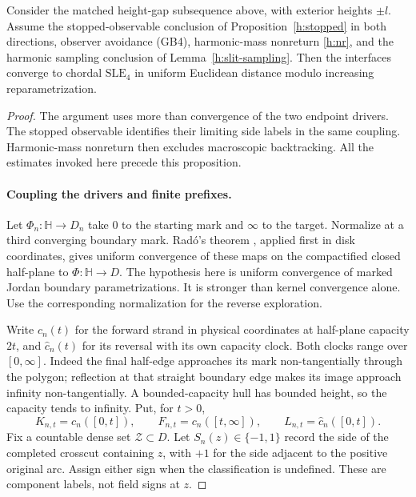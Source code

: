 \begin{proposition}
\label{h:uniform-path}
Consider the matched height-gap subsequence above, with exterior heights
$\pm l$. Assume the stopped-observable conclusion of
Proposition~\ref{h:stopped} in both directions, observer avoidance
\textup{(GB4)}, harmonic-mass nonreturn \eqref{h:nr}, and the harmonic
sampling conclusion of Lemma~\ref{h:slit-sampling}. Then the interfaces
converge to chordal $\mathrm{SLE}_4$ in uniform Euclidean distance modulo
increasing reparametrization.
\end{proposition}
\begin{proof}
The argument uses more than convergence of the two endpoint drivers.
The stopped observable identifies their limiting side labels in the same
coupling. Harmonic-mass nonreturn then excludes macroscopic backtracking.
All the estimates invoked here precede this proposition.

\paragraph{Coupling the drivers and finite prefixes.}
Let $\Phi_n:\mathbb H\to D_n$ take $0$ to the starting mark and $\infty$
to the target. Normalize at a third converging boundary mark. Rad\'o's
theorem \cite[Section 1, p.~182]{Rado}, applied first in disk coordinates,
gives uniform convergence of these maps on the compactified closed
half-plane to $\Phi:\mathbb H\to D$. The hypothesis here is uniform
convergence of marked Jordan boundary parametrizations. It is stronger
than kernel convergence alone. Use the corresponding normalization for
the reverse exploration.

Write $c_n(t)$ for the forward strand in physical coordinates at
half-plane capacity $2t$, and $\widehat c_n(t)$ for its reversal with its
own capacity clock. Both clocks range over $[0,\infty]$. Indeed the final
half-edge approaches its mark non-tangentially through the polygon;
reflection at that straight boundary edge makes its image approach
infinity non-tangentially. A bounded-capacity hull has bounded height,
so the capacity tends to infinity. Put, for $t>0$,
\[
 K_{n,t}=c_n([0,t]),\qquad F_{n,t}=c_n([t,\infty]),\qquad
 L_{n,t}=\widehat c_n([0,t]).
\]
Fix a countable dense set $\mathcal Z\subset D$. Let $S_n(z)\in\{-1,1\}$
record the side of the completed crosscut containing $z$, with $+1$
for the side adjacent to the positive original arc. Assign either sign
when the classification is undefined. These are component labels, not
field signs at $z$.


\end{proof}
